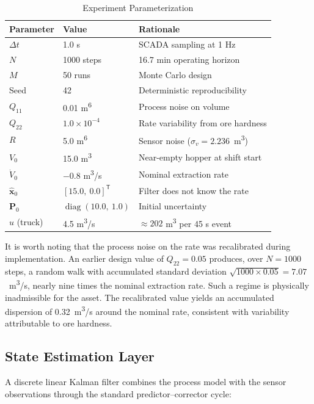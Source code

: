 \documentclass[conference]{IEEEtran}
\begin{document}
\begin{table}[!t]
\caption{Experiment Parameterization}
\label{tab:params}
\centering
\footnotesize
\begin{tabular}{@{}llp{3.5cm}@{}}
\toprule
\textbf{Parameter} & \textbf{Value} & \textbf{Rationale}\\
\midrule
$\Delta t$ & 1.0 s & SCADA sampling at 1 Hz\\
$N$ & 1000 steps & 16.7 min operating horizon\\
$M$ & 50 runs & Monte Carlo design\\
Seed & 42 & Deterministic reproducibility\\
$Q_{11}$ & 0.01 m\textsuperscript{6} & Process noise on volume\\
$Q_{22}$ & $1.0\times10^{-4}$ & Rate variability from ore hardness\\
$R$ & 5.0 m\textsuperscript{6} & Sensor noise ($\sigma_v = 2.236$~m\textsuperscript{3})\\
$V_0$ & 15.0 m\textsuperscript{3} & Near-empty hopper at shift start\\
$\dot{V}_0$ & $-0.8$ m\textsuperscript{3}/s & Nominal extraction rate\\
$\hat{\mathbf{x}}_0$ & $[15.0,\ 0.0]^{\mathsf{T}}$ & Filter does not know the rate\\
$\mathbf{P}_0$ & $\operatorname{diag}(10.0,\ 1.0)$ & Initial uncertainty\\
$u$ (truck) & 4.5 m\textsuperscript{3}/s & $\approx 202$ m\textsuperscript{3} per 45 s event\\
\bottomrule
\end{tabular}
\end{table}

It is worth noting that the process noise on the rate was recalibrated during
implementation. An earlier design value of $Q_{22} = 0.05$ produces, over
$N = 1000$ steps, a random walk with accumulated standard deviation
$\sqrt{1000 \times 0.05} = 7.07$~m\textsuperscript{3}/s, nearly nine times the
nominal extraction rate. Such a regime is physically inadmissible for the asset.
The recalibrated value yields an accumulated dispersion of
0.32~m\textsuperscript{3}/s around the nominal rate, consistent with variability
attributable to ore hardness.

\subsection{State Estimation Layer}

A discrete linear Kalman filter combines the process model with the sensor
observations through the standard predictor--corrector cycle:
\end{document}
